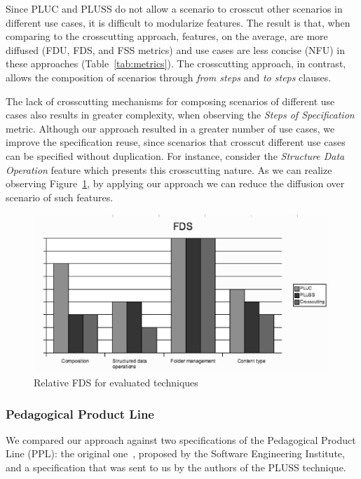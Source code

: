 \documentclass{acm_proc_article-sp}
\begin{document}
Since PLUC and PLUSS do not allow a
scenario to crosscut other scenarios in different use cases, it
is difficult to modularize features. The
result is that, when comparing to the crosscutting approach,
features, on the average,  are more 
diffused (FDU, FDS, and FSS metrics) and use cases are
less concise (NFU) in these approaches (Table~\ref{tab:metrics}). The crosscutting
approach, in contrast, allows the composition of scenarios
through \emph{from steps} and \emph{to steps} clauses. 

The lack of crosscutting mechanisms for composing scenarios of different use cases also results in greater complexity, when observing the \emph{Steps of Specification} metric. Although our approach resulted in a greater number of use cases, we improve the specification reuse, since scenarios that crosscut different use cases can be specified without duplication. For instance, consider the \emph{Structure Data Operation} feature which presents this crosscutting nature. As we can realize observing Figure~\ref{fig:fds-mms}, by applying our approach we can reduce the diffusion over scenario of such features.

 \begin{figure}[htb]
 \begin{center}
  \includegraphics[scale=0.42]{img/fds-mms.eps}
  \caption{Relative FDS for evaluated techniques}
  \label{fig:fds-mms}
  \end{center}
\end{figure}

\subsubsection{Pedagogical Product Line}

We compared our approach against two specifications of the Pedagogical Product Line (PPL): the original one~\cite{ppl-url}, proposed by the Software Engineering Institute, and a specification that was sent to us by the authors of the PLUSS technique. 
\end{document}
